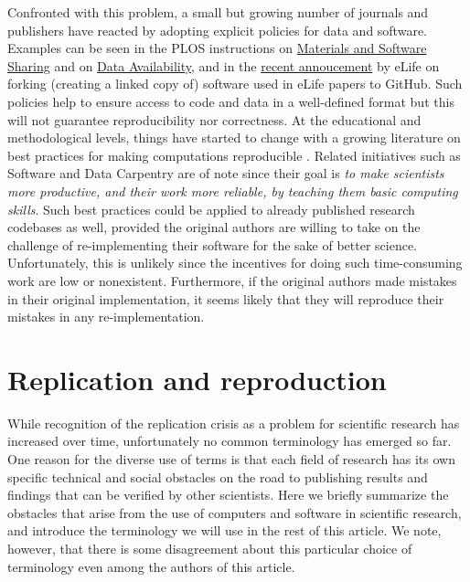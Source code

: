 \documentclass[a4paper,10pt, twocolumn]{article}
\begin{document}
Confronted with this problem, a small but growing number of journals and
publishers have reacted by adopting explicit policies for data and software. Examples can be seen in the PLOS instructions on
\href{http://journals.plos.org/plosone/s/materials-and-software-sharing}{Materials
  and Software Sharing} and
on \href{http://journals.plos.org/plosone/s/data-availability}{Data Availability},
and in the
\href{https://elifesciences.org/elife-news/inside-elife-forking-software-used-elife-papers-github}{recent
  annoucement} by eLife on forking (creating a linked copy of) software used in eLife papers to GitHub.
Such policies help to ensure access to code and data in a well-defined format
\citep{perkel:2016} but this will not guarantee reproducibility nor
correctness.
At the educational and methodological levels, things have started to change with a
growing literature on best practices for making computations reproducible
\citep{sandve:2013, crook:2013, wilson:2014, halchenko:2015, janz:2015,
  hinsen:2015}.
  Related initiatives such as Software and Data Carpentry
\citep{wilson:2016} are of note since their goal is {\em to make
scientists more productive, and their work more reliable, by teaching them basic computing skills}.
Such best practices could be applied to already published research codebases as well, provided the original authors are willing to take on the challenge of 
re-implementing their software for the sake of better science.
Unfortunately, this is unlikely since the
incentives for doing such time-consuming work are low or nonexistent.
Furthermore, if the original authors made mistakes in their original
implementation, it seems likely that they will reproduce their mistakes
in any re-implementation.\\


\section*{Replication and reproduction}
\label{sec:replication-reproduction}
While recognition of the replication crisis as a problem
for scientific research has increased over time, unfortunately no 
common terminology has emerged so far. One reason for
the diverse use of terms is that each field of research has its own
specific technical and social obstacles on the road to publishing
results and findings that can be verified by other scientists. Here we
briefly summarize the obstacles that arise from the use of computers
and software in scientific research, and introduce the terminology we
will use in the rest of this article. We note, however, that there is
some disagreement about this particular choice of terminology even
among the authors of this article. \\
\end{document}
